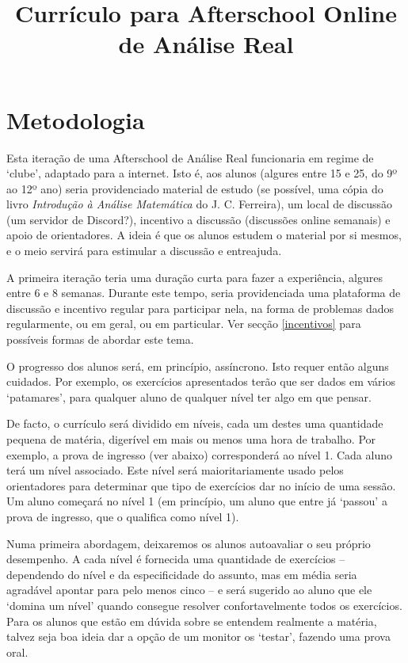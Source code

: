 \documentclass{article}
\title{Currículo para Afterschool Online de Análise Real}
\author{}
\date{}
\begin{document}
	\maketitle
	
	\section{Metodologia}
	
	Esta iteração de uma Afterschool de Análise Real funcionaria em regime de `clube', adaptado para a internet. Isto é, aos alunos (algures entre 15 e 25, do 9º ao 12º ano) seria providenciado material de estudo (se possível, uma cópia do livro \emph{Introdução à Análise Matemática} do J. C. Ferreira), um local de discussão (um servidor de Discord?), incentivo a discussão (discussões online semanais) e apoio de orientadores. A ideia é que os alunos estudem o material por si mesmos, e o meio servirá para estimular a discussão e entreajuda.
	
	A primeira iteração teria uma duração curta para fazer a experiência, algures entre 6 e 8 semanas. Durante este tempo, seria providenciada uma plataforma de discussão e incentivo regular para participar nela, na forma de problemas dados regularmente, ou em geral, ou em particular. Ver secção \ref{incentivos} para possíveis formas de abordar este tema.
	
	O progresso dos alunos será, em princípio, assíncrono. Isto requer então alguns cuidados. Por exemplo, os exercícios apresentados terão que ser dados em vários `patamares', para qualquer aluno de qualquer nível ter algo em que pensar.
	
	De facto, o currículo será dividido em níveis, cada um destes uma quantidade pequena de matéria, digerível em mais ou menos uma hora de trabalho. Por exemplo, a prova de ingresso (ver abaixo) corresponderá ao nível 1. Cada aluno terá um nível associado. Este nível será maioritariamente usado pelos orientadores para determinar que tipo de exercícios dar no início de uma sessão. Um aluno começará no nível 1 (em princípio, um aluno que entre já `passou' a prova de ingresso, que o qualifica como nível 1).
	
	Numa primeira abordagem, deixaremos os alunos autoavaliar o seu próprio desempenho. A cada nível é fornecida uma quantidade de exercícios -- dependendo do nível e da especificidade do assunto, mas em média seria agradável apontar para pelo menos cinco -- e será sugerido ao aluno que ele `domina um nível' quando consegue resolver confortavelmente todos os exercícios. Para os alunos que estão em dúvida sobre se entendem realmente a matéria, talvez seja boa ideia dar a opção de um monitor os `testar', fazendo uma prova oral.
	
\end{document}
